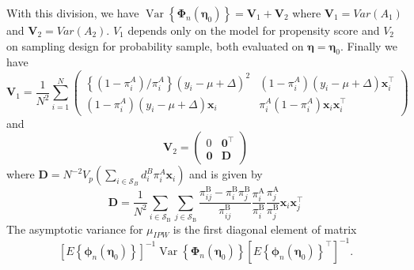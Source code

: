 \documentclass[
  letterpaper,
  DIV=11,
  numbers=noendperiod]{scrreprt}
\begin{document}
With this division, we have
\(\operatorname{Var}\left\{\boldsymbol{\Phi}_n\left(\boldsymbol{\eta}_0\right)\right\}=\mathbf{V}_1+\mathbf{V}_2\)
where \(\mathbf{V}_1 = Var \left(A_1\right)\) and
\(\mathbf{V}_2 = Var \left(A_2\right)\). \(V_1\) depends only on the
model for propensity score and \(V_2\) on sampling design for
probability sample, both evaluated on
\(\boldsymbol{\eta} = \boldsymbol{\eta}_0\). Finally we have \[
\mathbf{V}_1=\frac{1}{N^2} \sum_{i=1}^N\left(\begin{array}{cc}
\left\{\left(1-\pi_i^A\right) / \pi_i^A\right\}\left(y_i-\mu+\Delta\right)^2 & \left(1-\pi_i^A\right)\left(y_i-\mu+\Delta\right) \boldsymbol{x}_i^{\top} \\
\left(1-\pi_i^A\right)\left(y_i-\mu+\Delta\right) \boldsymbol{x}_i & \pi_i^A\left(1-\pi_i^A\right) \boldsymbol{x}_i \boldsymbol{x}_i^{\top}
\end{array}\right)
\] and \[
\mathbf{V}_2=\left(\begin{array}{ll}
0 & \mathbf{0}^{\top} \\
\mathbf{0} & \mathbf{D}
\end{array}\right)
\] where
\(\mathbf{D}=N^{-2} V_p\left(\sum_{i \in \mathcal{S}_B} d_i^B \pi_i^A \boldsymbol{x}_i\right)\)
and is given by \[
\begin{equation}
{\mathbf{D}}=\frac{1}{N^2} \sum_{i \in \mathcal{S}_{\mathrm{B}}} \sum_{j \in \mathcal{S}_{\mathrm{B}}} \frac{\pi_{i j}^{\mathrm{B}}-\pi_i^{\mathrm{B}} \pi_j^{\mathrm{B}}}{\pi_{i j}^{\mathrm{B}}} \frac{{\pi}_i^{\mathrm{A}}}{\pi_i^{\mathrm{B}}} \frac{{\pi}_j^{\mathrm{A}}}{\pi_j^{\mathrm{B}}} \boldsymbol{x}_i \boldsymbol{x}_j^{\top}
\end{equation}
\] The asymptotic variance for \(\mu_{IPW}\) is the first diagonal
element of matrix \[
\left[E\left\{\boldsymbol{\phi}_n\left(\boldsymbol{\eta}_0\right)\right\}\right]^{-1} \operatorname{Var}\left\{\boldsymbol{\Phi}_n\left(\boldsymbol{\eta}_0\right)\right\}\left[E\left\{\boldsymbol{\phi}_n\left(\boldsymbol{\eta}_0\right)\right\}^{\top}\right]^{-1}.
\]


\chapter{}\label{section}
\end{document}
